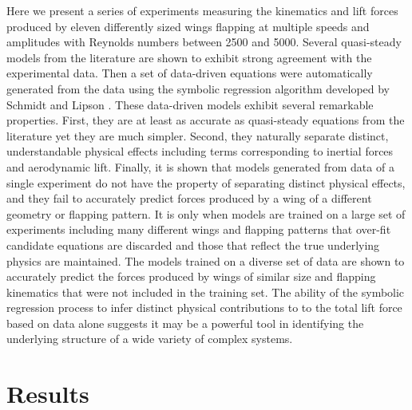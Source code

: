 \documentclass[fleqn,10pt]{wlscirep}
\begin{document}
Here we present a series of experiments measuring the kinematics and lift forces produced by eleven
differently sized wings flapping at multiple speeds and amplitudes with Reynolds numbers between
2500 and 5000. Several quasi-steady models from the literature are shown to exhibit strong agreement
with the experimental data.  Then a set of data-driven equations were automatically generated from
the data using the symbolic regression algorithm developed by Schmidt and Lipson \cite{schmidt2009distilling}.
These data-driven models exhibit several remarkable properties.  First, they are at least as
accurate as quasi-steady equations from the literature yet they are much simpler.  Second, they
naturally separate distinct, understandable physical effects including terms corresponding to
inertial forces and aerodynamic lift.  Finally, it is shown that models generated from data of a
single experiment do not have the property of separating distinct physical effects, and they fail to
accurately predict forces produced by a wing of a different geometry or flapping pattern.  It is
only when models are trained on a large set of experiments including many different wings and
flapping patterns that over-fit candidate equations are discarded and those that reflect the true
underlying physics are maintained.  The models trained on a diverse set of data are shown to
accurately predict the forces produced by wings of similar size and flapping kinematics that were
not included in the training set. The ability of the symbolic regression process to infer distinct
physical contributions to to the total lift force based on data alone suggests it may be a powerful
tool in identifying the underlying structure of a wide variety of complex systems.

\section*{Results}

%
%
%
%
%  
\end{document}
